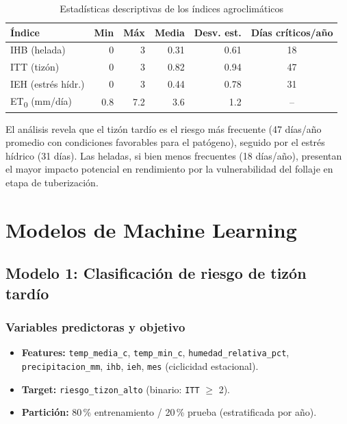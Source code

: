 \documentclass[12pt,a4paper]{article}
\begin{document}
\begin{table}[H]
\centering
\caption{Estadísticas descriptivas de los índices agroclimáticos}
\label{tab:indices}
\begin{tabular}{lrrrrc}
\toprule
\textbf{Índice} & \textbf{Min} & \textbf{Máx} & \textbf{Media} &
\textbf{Desv. est.} & \textbf{Días críticos/año} \\
\midrule
IHB (helada)      & 0 & 3 & 0.31 & 0.61 & 18 \\
ITT (tizón)       & 0 & 3 & 0.82 & 0.94 & 47 \\
IEH (estrés hídr.)& 0 & 3 & 0.44 & 0.78 & 31 \\
ET\textsubscript{0} (mm/día) & 0.8 & 7.2 & 3.6 & 1.2 & -- \\
\bottomrule
\end{tabular}
\end{table}

El análisis revela que el tizón tardío es el riesgo más frecuente
(47 días/año promedio con condiciones favorables para el patógeno),
seguido por el estrés hídrico (31 días). Las heladas, si bien menos
frecuentes (18 días/año), presentan el mayor impacto potencial en
rendimiento por la vulnerabilidad del follaje en etapa de tuberización.

\section{Modelos de Machine Learning}

\subsection{Modelo 1: Clasificación de riesgo de tizón tardío}

\subsubsection{Variables predictoras y objetivo}

\begin{itemize}[noitemsep]
  \item \textbf{Features:} \texttt{temp\_media\_c}, \texttt{temp\_min\_c},
    \texttt{humedad\_relativa\_pct}, \texttt{precipitacion\_mm},
    \texttt{ihb}, \texttt{ieh}, \texttt{mes} (ciclicidad estacional).
  \item \textbf{Target:} \texttt{riesgo\_tizon\_alto} (binario:
    \texttt{ITT} $\geq$ 2).
  \item \textbf{Partición:} 80\,\% entrenamiento / 20\,\% prueba
    (estratificada por año).
\end{itemize}
\end{document}
